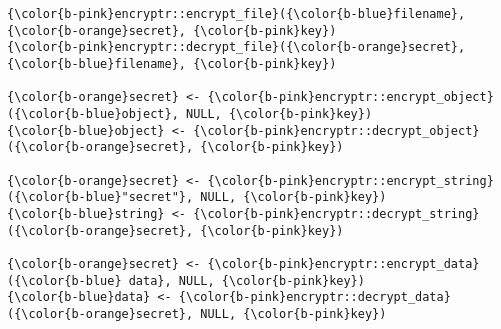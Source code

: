 \documentclass[class=minimal,border=0]{standalone}
\begin{document}
%
\begin{BVerbatim}[bgcolor=b-darkgrey]
{\color{b-pink}encryptr::encrypt_file}({\color{b-blue}filename}, {\color{b-orange}secret}, {\color{b-pink}key})
{\color{b-pink}encryptr::decrypt_file}({\color{b-orange}secret}, {\color{b-blue}filename}, {\color{b-pink}key})

{\color{b-orange}secret} <- {\color{b-pink}encryptr::encrypt_object}({\color{b-blue}object}, NULL, {\color{b-pink}key})
{\color{b-blue}object} <- {\color{b-pink}encryptr::decrypt_object}({\color{b-orange}secret}, {\color{b-pink}key})

{\color{b-orange}secret} <- {\color{b-pink}encryptr::encrypt_string}({\color{b-blue}"secret"}, NULL, {\color{b-pink}key})
{\color{b-blue}string} <- {\color{b-pink}encryptr::decrypt_string}({\color{b-orange}secret}, {\color{b-pink}key})

{\color{b-orange}secret} <- {\color{b-pink}encryptr::encrypt_data}({\color{b-blue} data}, NULL, {\color{b-pink}key})
{\color{b-blue}data} <- {\color{b-pink}encryptr::decrypt_data}({\color{b-orange}secret}, NULL, {\color{b-pink}key})
\end{BVerbatim}
\end{document}
